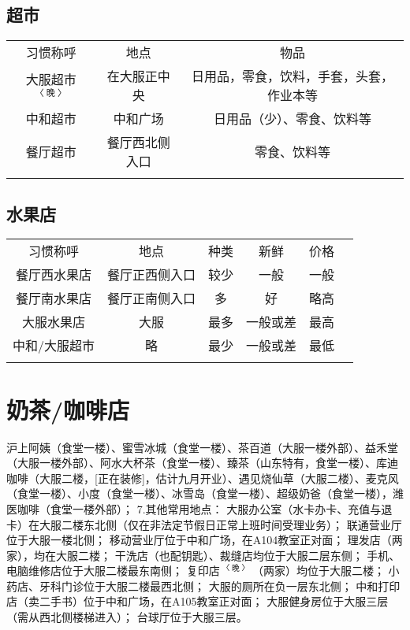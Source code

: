 \subsection[超市]{超市}
\begin{table*}[ht]
    \centering
    \begin{tabular}{|c|c|c|}
        \Xhline{1.2pt}
        习惯称呼         & 地点      & 物品                   \\
        \Xhline{1.2pt}
        大服超市$^{〈晚〉}$ & 在大服正中央  & 日用品，零食，饮料，手套，头套，作业本等 \\
        \hline
        中和超市         & 中和广场    & 日用品（少）、零食、饮料等        \\
        \hline
        餐厅超市         & 餐厅西北侧入口 & 零食、饮料等               \\
        \Xhline{1.2pt}
    \end{tabular}
\end{table*}

\subsection[水果店]{水果店}
\begin{table*}[ht]
    \centering
    \begin{tabular}{|c|c|c|c|c|c|}
        \Xhline{1.2pt}
        习惯称呼    & 地点      & 种类 & 新鲜   & 价格 \\
        \Xhline{1.2pt}
        餐厅西水果店  & 餐厅正西侧入口 & 较少 & 一般   & 一般 \\
        \hline
        餐厅南水果店  & 餐厅正南侧入口 & 多  & 好    & 略高 \\
        \hline
        大服水果店   & 大服      & 最多 & 一般或差 & 最高 \\
        \hline
        中和/大服超市 & 略       & 最少 & 一般或差 & 最低 \\
        \Xhline{1.2pt}
    \end{tabular}
\end{table*}

\section[奶茶/咖啡店]{奶茶/咖啡店}

沪上阿姨（食堂一楼）、蜜雪冰城（食堂一楼）、茶百道（大服一楼外部）、益禾堂（大服一楼外部）、阿水大杯茶（食堂一楼）、臻茶（山东特有，食堂一楼）、库迪咖啡（大服二楼，[正在装修]，估计九月开业）、遇见烧仙草（大服二楼）、麦克风（食堂一楼）、小度（食堂一楼）、冰雪岛（食堂一楼）、超级奶爸（食堂一楼），潍医咖啡（食堂一楼外部）；
7.其他常用地点：
大服办公室（水卡办卡、充值与退卡）在大服二楼东北侧（仅在非法定节假日正常上班时间受理业务）；
联通营业厅位于大服一楼北侧；
移动营业厅位于中和广场，在A104教室正对面；
理发店（两家），均在大服二楼；
干洗店（也配钥匙）、裁缝店均位于大服二层东侧；
手机、电脑维修店位于大服二楼最东南侧；
复印店$^{〈晚〉}$（两家）均位于大服二楼；
小药店、牙科门诊位于大服二楼最西北侧；
大服的厕所在负一层东北侧；
中和打印店（卖二手书）位于中和广场，在A105教室正对面；
大服健身房位于大服三层（需从西北侧楼梯进入）；
台球厅位于大服三层。

